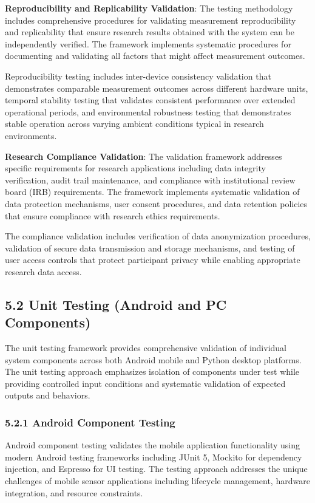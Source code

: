 \documentclass[12pt,a4paper]{article}
\begin{document}
\textbf{Reproducibility and Replicability Validation}: The testing methodology includes comprehensive procedures for
validating measurement reproducibility and replicability that ensure research results obtained with the system can be
independently verified. The framework implements systematic procedures for documenting and validating all factors that
might affect measurement outcomes.

Reproducibility testing includes inter-device consistency validation that demonstrates comparable measurement outcomes
across different hardware units, temporal stability testing that validates consistent performance over extended
operational periods, and environmental robustness testing that demonstrates stable operation across varying ambient
conditions typical in research environments.

\textbf{Research Compliance Validation}: The validation framework addresses specific requirements for research applications
including data integrity verification, audit trail maintenance, and compliance with institutional review board (IRB)
requirements. The framework implements systematic validation of data protection mechanisms, user consent procedures, and
data retention policies that ensure compliance with research ethics requirements.

The compliance validation includes verification of data anonymization procedures, validation of secure data transmission
and storage mechanisms, and testing of user access controls that protect participant privacy while enabling appropriate
research data access.

\subsection{5.2 Unit Testing (Android and PC Components)}

The unit testing framework provides comprehensive validation of individual system components across both Android mobile
and Python desktop platforms. The unit testing approach emphasizes isolation of components under test while providing
controlled input conditions and systematic validation of expected outputs and behaviors.

\subsubsection{5.2.1 Android Component Testing}

Android component testing validates the mobile application functionality using modern Android testing frameworks
including JUnit 5, Mockito for dependency injection, and Espresso for UI testing. The testing approach addresses the
unique challenges of mobile sensor applications including lifecycle management, hardware integration, and resource
constraints.
\end{document}
